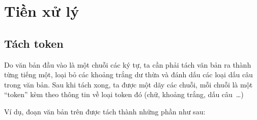 \documentclass[a4paper,oneside,14pt]{extbook} %
\begin{document}
\section{Tiền xử lý}


\subsection{Tách token}
\label{sec:preprocess:token}

Do văn bản đầu vào là một chuỗi các ký tự, ta cần phải tách văn bản ra
thành từng tiếng một, loại bỏ các khoảng trắng dư thừa và đánh dấu các
loại dấu câu trong văn bản. Sau khi tách xong, ta được một dãy các
chuỗi, mỗi chuỗi là một ``token'' kèm theo thông tin về loại token đó
(chữ, khoảng trắng, dấu câu~\ldots)

Ví dụ, đoạn văn bản trên được tách thành những phần như sau:
\end{document}
